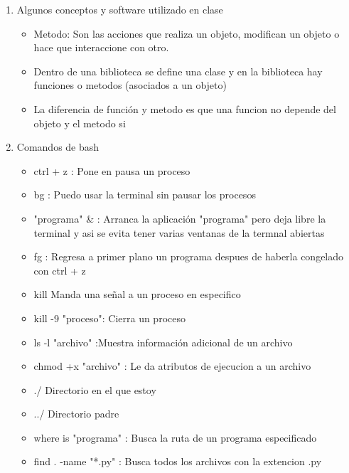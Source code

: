 \documentclass{book}
\begin{document}
\begin{enumerate}%
	\item Algunos conceptos y software utilizado en clase%
	\begin{itemize}
		\item Metodo: Son las acciones que realiza un objeto, modifican un objeto o hace que interaccione con otro.
		\item Dentro de una biblioteca se define una clase y en la biblioteca hay funciones o metodos (asociados a un objeto)	
		\item La diferencia de función y metodo es que una funcion no depende del objeto y el metodo si
		
	\end{itemize}
	
	\item Comandos de bash%
	\begin{itemize}%
		\item ctrl + z : Pone en pausa un proceso
		\item bg : Puedo usar la terminal sin pausar los procesos
		\item "programa" \& : Arranca la aplicación "programa" pero deja libre la terminal y asi se evita tener varias ventanas de la termnal abiertas
		\item fg : Regresa a primer plano un programa despues de haberla congelado con ctrl + z
		\item kill Manda una señal a un proceso en especifico
		\item kill -9 "proceso": Cierra un proceso
		\item ls -l "archivo" :Muestra información adicional de un archivo
		\item chmod +x "archivo" : Le da atributos de ejecucion a un archivo
		\item ./ Directorio en el que estoy
		\item ../ Directorio padre
		\item where is "programa" : Busca la ruta de un programa especificado
		\item find . -name "*.py" : Busca todos los archivos con la extencion .py
		

\end{itemize}
\end{enumerate}
\end{document}
